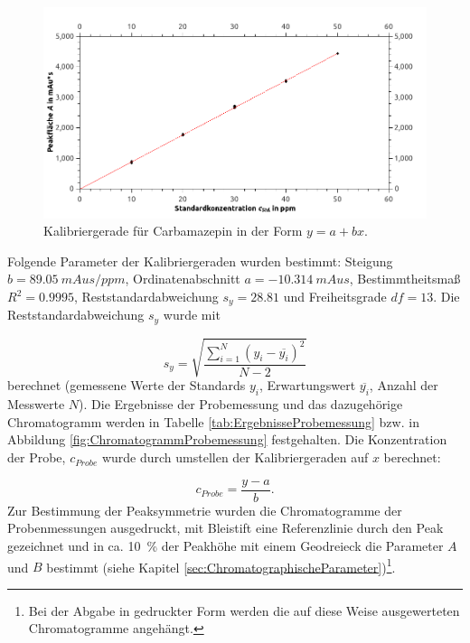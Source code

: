       \begin{figure}[H]
        \includegraphics[scale=0.4, center]{images/Kalibriergerade.png} 
        \caption[Kalibriergerade für Carbamazepin, Quelle: Autor]{Kalibriergerade für Carbamazepin in der Form $y = a + bx$.}
        \label{fig:KalibriergeradeCarbamazepin}
      \end{figure}
    \noindent Folgende Parameter der Kalibriergeraden wurden bestimmt: Steigung $b = \SI[mode=text]{89.05}{mAus\per ppm}$, Ordinatenabschnitt $a = \SI[mode=text]{-10.314}{mAus}$, Bestimmtheitsmaß $R^2 = 0.9995$, Reststandardabweichung $s_y = 28.81$ und Freiheitsgrade $df = 13$. Die Reststandardabweichung $s_y$ wurde mit 
    
      \begin{equation}
        s_y = \sqrt{\frac{\sum_{i=1}^N \left(y_i - \overline{y_i}\right)^2}{N-2}}
      \end{equation}
    berechnet (gemessene Werte der Standards $y_i$, Erwartungswert $\overline{y_i}$, Anzahl der Messwerte $N$). Die Ergebnisse der Probemessung und das dazugehörige Chromatogramm werden in Tabelle \ref{tab:ErgebnisseProbemessung} bzw. in Abbildung \ref{fig:ChromatogrammProbemessung} festgehalten. Die Konzentration der Probe, $c_{Probe}$ wurde durch umstellen der Kalibriergeraden auf $x$ berechnet:
    
      \begin{equation}
        c_{Probe} = \frac{y - a}{b}.
      \end{equation}
    Zur Bestimmung der Peaksymmetrie wurden die Chromatogramme der Probenmessungen ausgedruckt, mit Bleistift eine Referenzlinie durch den Peak gezeichnet und in ca. \SI[mode=text]{10}{\percent} der Peakhöhe mit einem Geodreieck die Parameter $A$ und $B$ bestimmt (siehe Kapitel \ref{sec:ChromatographischeParameter})\footnote{Bei der Abgabe in gedruckter Form werden die auf diese Weise ausgewerteten Chromatogramme angehängt.}. 
    

